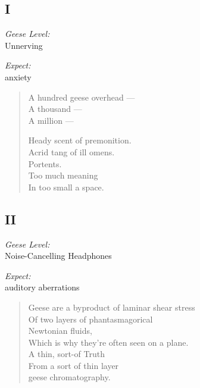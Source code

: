 \subsection*{I}
\noindent\begin{paracol}{2}
    \begin{flushright}
      \textit{Geese Level:} \\
      Unnerving

      \textit{Expect:}\\
      anxiety
    \end{flushright}
    \switchcolumn
    \begin{verse}
      A hundred geese overhead ---\\
      \vin A thousand --- \\
      \vin \vin A million ---

      Heady scent of premonition. \\
      Acrid tang of ill omens. \\
      Portents.\\
      Too much meaning \\
      \vin In too small a space.
    \end{verse}
\end{paracol}

\newpage

\null
\vspace{1cm}

\subsection*{II}
\noindent\begin{paracol}{2}
    \begin{flushright}
      \textit{Geese Level:} \\
      Noise-Cancelling Headphones

      \textit{Expect:}\\
      auditory aberrations
    \end{flushright}
    \switchcolumn
    \begin{verse}
      Geese are a byproduct of laminar shear stress \\
      \vin Of two layers of phantasmagorical\\
      \vin \vin Newtonian fluids, \\
      \vin Which is why they’re often seen on a plane. \\
      A thin, sort-of Truth \\
      \vin From a sort of thin layer \\
      \vin \vin geese chromatography.
    \end{verse}
\end{paracol}


